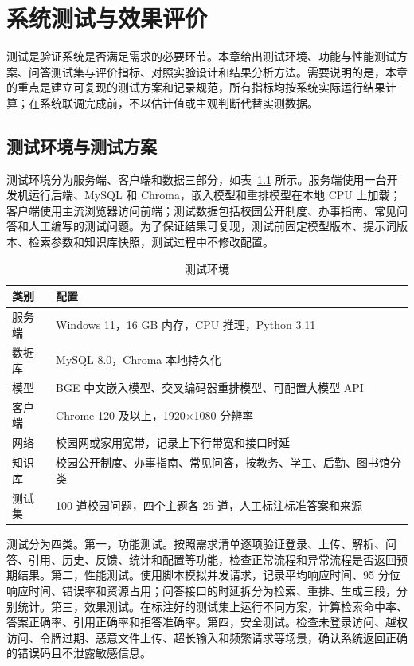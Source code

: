 \chapter{系统测试与效果评价}
\label{chap:evaluation}

测试是验证系统是否满足需求的必要环节。本章给出测试环境、功能与性能测试方案、问答测试集与评价指标、对照实验设计和结果分析方法。需要说明的是，本章的重点是建立可复现的测试方案和记录规范，所有指标均按系统实际运行结果计算；在系统联调完成前，不以估计值或主观判断代替实测数据。

\section{测试环境与测试方案}
\label{sec:test-env}

测试环境分为服务端、客户端和数据三部分，如表~\ref{tab:test-env} 所示。服务端使用一台开发机运行后端、MySQL 和 Chroma，嵌入模型和重排模型在本地 CPU 上加载；客户端使用主流浏览器访问前端；测试数据包括校园公开制度、办事指南、常见问答和人工编写的测试问题。为了保证结果可复现，测试前固定模型版本、提示词版本、检索参数和知识库快照，测试过程中不修改配置。

\begin{table}[H]
  \centering
  \caption{测试环境}
  \label{tab:test-env}
  \renewcommand{\arraystretch}{1.25}
  \begin{tabular}{p{3.0cm}p{9.6cm}}
    \toprule
    类别 & 配置 \\
    \midrule
    服务端 & Windows 11，16 GB 内存，CPU 推理，Python 3.11 \\
    数据库 & MySQL 8.0，Chroma 本地持久化 \\
    模型 & BGE 中文嵌入模型、交叉编码器重排模型、可配置大模型 API \\
    客户端 & Chrome 120 及以上，1920$\times$1080 分辨率 \\
    网络 & 校园网或家用宽带，记录上下行带宽和接口时延 \\
    知识库 & 校园公开制度、办事指南、常见问答，按教务、学工、后勤、图书馆分类 \\
    测试集 & 100 道校园问题，四个主题各 25 道，人工标注标准答案和来源 \\
    \bottomrule
  \end{tabular}
\end{table}

测试分为四类。第一，功能测试。按照需求清单逐项验证登录、上传、解析、问答、引用、历史、反馈、统计和配置等功能，检查正常流程和异常流程是否返回预期结果。第二，性能测试。使用脚本模拟并发请求，记录平均响应时间、95 分位响应时间、错误率和资源占用；问答接口的时延拆分为检索、重排、生成三段，分别统计。第三，效果测试。在标注好的测试集上运行不同方案，计算检索命中率、答案正确率、引用正确率和拒答准确率。第四，安全测试。检查未登录访问、越权访问、令牌过期、恶意文件上传、超长输入和频繁请求等场景，确认系统返回正确的错误码且不泄露敏感信息。

